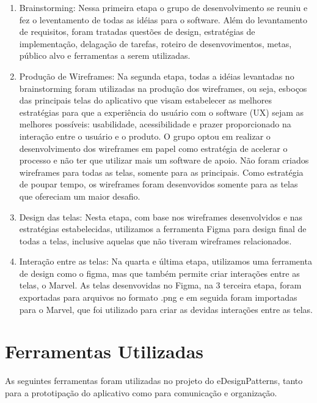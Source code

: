 \begin{enumerate}
	\item Brainstorming: Nessa primeira etapa o grupo de desenvolvimento se reuniu e fez o leventamento de todas as idéias para o software. Além do levantamento de requisitos, foram tratadas questões de design, estratégias de implementação, delagação de tarefas, roteiro de desenvovimentos, metas, público alvo e ferramentas a serem utilizadas. 
	\item Produção de Wireframes: Na segunda etapa, todas a idéias levantadas no brainstorming foram utilizadas na produção dos wireframes, ou seja, esboços das principais telas do aplicativo que visam estabelecer as melhores estratégias para que a experiência do usuário com o software (UX) sejam as melhores possíveis: usabilidade, acessibilidade e prazer proporcionado na interação entre o usuário e o produto. O grupo optou em realizar o desenvolvimento dos wireframes em papel como estratégia de acelerar o processo e não ter que utilizar mais um software de apoio. Não foram criados wireframes para todas as telas, somente para as principais. Como estratégia de poupar tempo, os wireframes foram desenvovidos somente para as telas que ofereciam um maior desafio.
	\item Design das telas: Nesta etapa, com base nos wireframes desenvolvidos e nas estratégias estabelecidas, utilizamos a ferramenta Figma para design final de todas a telas, inclusive aquelas que não tiveram wireframes relacionados. 
	\item Interação entre as telas: Na quarta e última etapa, utilizamos uma ferramenta de design como o figma, mas que também permite criar interações entre as telas, o Marvel. As telas desenvovidas no Figma, na 3 terceira etapa, foram exportadas para arquivos no formato .png e em seguida foram importadas para o Marvel, que foi utilizado para criar as devidas interações entre as telas.
\end{enumerate}


\section{Ferramentas Utilizadas}

As seguintes ferramentas foram utilizadas no projeto do eDesignPatterns, tanto para a prototipação do aplicativo como para comunicação e organização.

